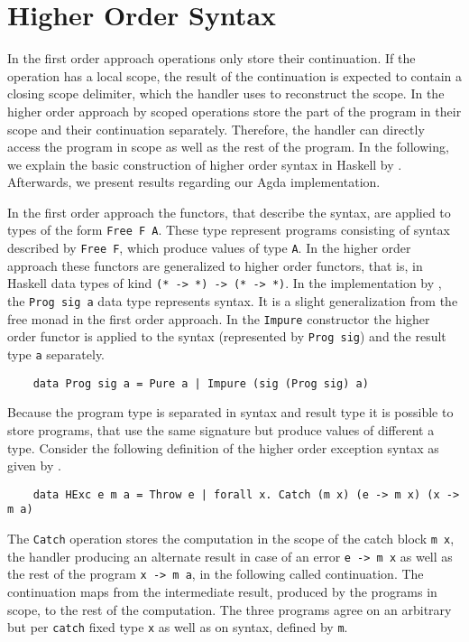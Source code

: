 \section{Higher Order Syntax}
\label{higher-order:syntax}

In the first order approach operations only store their continuation.
If the operation has a local scope, the result of the continuation is expected
to contain a closing scope delimiter, which the handler uses to reconstruct
the scope.
In the higher order approach by \textcite{DBLP:conf/haskell/WuSH14} scoped
operations store the part of the program in their scope and their continuation
separately.
Therefore, the handler can directly access the program in scope as well as the
rest of the program.
In the following, we explain the basic construction of higher order syntax in
Haskell by \textcite{DBLP:conf/haskell/WuSH14}.
Afterwards, we present results regarding our Agda implementation.

In the first order approach the functors, that describe the syntax, are applied
to types of the form \texttt{Free F A}.
These type represent programs consisting of syntax described by \texttt{Free F},
which produce values of type \texttt{A}.
In the higher order approach these functors are generalized to higher order
functors, that is, in Haskell data types of kind \texttt{(* -> *) -> (* -> *)}.
In the implementation by \textcite{DBLP:conf/haskell/WuSH14}, the
\texttt{Prog sig a} data type represents syntax.
It is a slight generalization from the free monad in the first order approach.
In the \texttt{Impure} constructor the higher order functor is
applied to the syntax (represented by \texttt{Prog sig}) and the
result type \texttt{a} separately.

\begin{verbatim}
    data Prog sig a = Pure a | Impure (sig (Prog sig) a)
\end{verbatim}
Because the program type is separated in syntax and result type it is possible
to store programs, that use the same signature but produce values of different a
type.
Consider the following definition of the higher order exception syntax as given
by \textcite{DBLP:conf/haskell/WuSH14}.

\begin{verbatim}
    data HExc e m a = Throw e | forall x. Catch (m x) (e -> m x) (x -> m a)
\end{verbatim}
The \texttt{Catch} operation stores the computation in the scope of the catch
block \texttt{m x}, the handler producing an alternate result in case of an
error \texttt{e -> m x} as well as the rest of the program \texttt{x -> m a}, in
the following called continuation.
The continuation maps from the intermediate result, produced by the programs in
scope, to the rest of the computation.
The three programs agree on an arbitrary but per \texttt{catch} fixed type
\texttt{x} as well as on syntax, defined by \texttt{m}.


